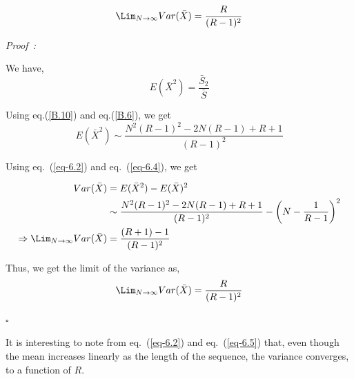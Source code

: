 \begin{multicols}{2}
\vspace{-.7cm}

\begin{eqnarray*}
\Lim_{N \rightarrow \infty} Var(\bar{X}) = \frac{R}{(R -1)^2}
\end{eqnarray*}

\vspace{-.4cm}

\noindent
{\it Proof~:}

We have,
\begin{equation}
E(\bar{X}^2) = \frac{\bar{S}_2}{\bar{S}}\label{eq-6.3}
\end{equation}

\vspace{-.2cm}

Using eq.(\ref{B.10}) and eq.(\ref{B.6}), we get
\begin{equation}
E(\bar{X}^2) \sim \frac{N^2(R-1)^2 - 2N(R-1) + R+1}{(R-1)^2}\label{eq-6.4}
\end{equation}

\vspace{-.3cm}

Using eq.~(\ref{eq-6.2}) and eq.~(\ref{eq-6.4}), we get

\vspace{-.3cm}

{\fontsize{8}{9}\selectfont\begin{align*}
Var(\bar{X})&= E(\bar{X}^2)-E(\bar{X})^2\nonumber \\
&\sim \frac{N^2(R-1)^2 - 2N(R-1) + R+1}{(R-1)^2}-\left(N - \frac{1}{R-1}\right)^2\nonumber\\
\Rightarrow \Lim_{N \rightarrow \infty}Var(\bar{X})& =  \frac{(R+1)-1}{(R-1)^2}\nonumber
\end{align*}}

\vspace{-.6cm}

Thus, we get the limit of the variance as,
\begin{equation}
\Lim_{N \rightarrow \infty}Var(\bar{X}) = \frac{R}{(R-1)^2}\label{eq-6.5}
\end{equation}

\vspace{-.5cm}

\hfill{$\square$\\}

\vspace{-.7cm}

It is interesting to note from eq.~(\ref{eq-6.2}) and eq.~(\ref{eq-6.5}) that, even though the mean increases linearly as the length of the sequence, the variance converges, to a function of $R$.


\end{multicols}
